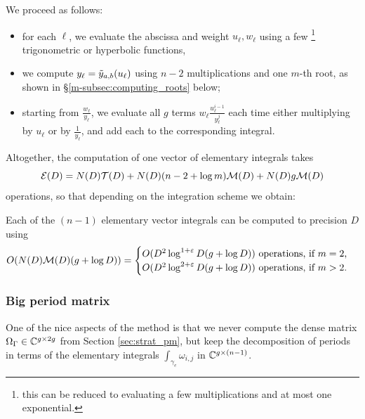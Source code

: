 \documentclass[main.tex]{subfiles}
\begin{document}
   We proceed as follows:
   \begin{itemize}
   \item for each $\ell$, we evaluate the abscissa and weight $u_\ell,w_\ell$ using
       a few \footnote{this can be reduced to evaluating
           a few multiplications and at most one exponential.} trigonometric or hyperbolic functions,
   \item we compute $y_\ell=\tilde{y}_{a,b}(u_\ell)$ using $n-2$ multiplications and one $m$-th root,
       as shown in \S \ref{m-subsec:computing_roots} below;
   \item starting from $\frac{w_\ell}{y_\ell}$, we evaluate all $g$ terms $w_\ell\frac{u_\ell^{i-1}}{y_\ell^j}$
       each time either multiplying by $u_\ell$ or by $\frac{1}{y_\ell}$, and add each to the corresponding
       integral.
   \end{itemize}

   Altogether, the computation of one vector of elementary integrals takes
   \begin{equation}\label{eq:elem_int_complexity}
    \mathcal E(D) = N(D)\mathcal T(D)+N(D)(n-2+\log m)\mathcal M(D)+N(D)g\mathcal M(D)
   \end{equation}
    operations,
   so that depending on the integration scheme we obtain:
   \begin{thm}\label{thm:complexity_integrals}
       Each of the $(n-1)$ elementary vector integrals can be computed to precision $D$ using
       \begin{equation*}
           O(N(D)\mathcal M(D)(g+\log D)) =
           \begin{cases}
               O(D^2\log^{1+\varepsilon} D (g + \log D)) \text{ operations, if $m=2$,}\\
               O(D^2\log^{2+\varepsilon} D (g + \log D)) \text{ operations, if $m>2$.}
           \end{cases}
       \end{equation*}
   \end{thm}

   \subsubsection{Big period matrix}

   One of the nice aspects of the method is that we never compute
   the dense matrix $\Omega_{\Gamma}\in\mathbb{C}^{g\times 2g}$ from Section \ref{sec:strat_pm}, but
   keep the decomposition of periods in terms of the elementary integrals
   $\int_{\gamma_e}\omega_{i,j}$ in $\mathbb{C}^{g\times (n-1)}$.
\end{document}
